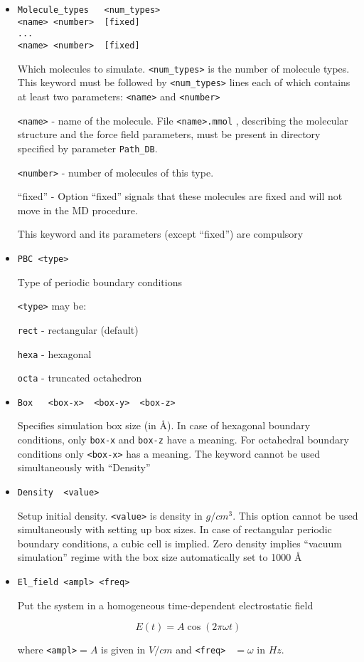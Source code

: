 \documentclass{article}
\begin{document}
\begin{itemize}

\item
\begin{verbatim}
Molecule_types   <num_types>
<name> <number>  [fixed]
...
<name> <number>  [fixed]
\end{verbatim}

Which molecules to simulate. \verb|<num_types>| is the number of molecule
types. This keyword must be followed by \verb|<num_types>| lines each of 
which contains at least two parameters: \verb|<name>| and \verb|<number>|

\verb|<name>| - name of the molecule. File \verb|<name>.mmol| , describing
the molecular structure and the force field parameters, must be 
present in directory specified by parameter \verb|Path_DB|.

\verb|<number>| - number of molecules of this type.

``fixed'' - Option ``fixed''  signals that 
these molecules are fixed and will not move in the MD procedure.

This keyword and its parameters (except ``fixed'') are compulsory

\item
\verb|PBC <type>|

Type of periodic boundary conditions

\verb|<type>| may be:

\verb|rect|   - rectangular (default)

\verb|hexa|   - hexagonal

\verb|octa|   - truncated octahedron

\item
\verb|Box   <box-x>  <box-y>  <box-z>|

Specifies simulation box size (in \AA). In case of hexagonal boundary 
conditions, only \verb|box-x| and \verb|box-z| have a meaning. 
For octahedral boundary conditions only \verb|<box-x>| has a meaning. 
The keyword cannot be used simultaneously with ``Density''

\item
\verb|Density  <value>|

Setup initial density. \verb|<value>| is density in $g/cm^3$. This option 
cannot be used simultaneously with setting up box sizes. In case of 
rectangular periodic boundary conditions, a cubic cell is implied. Zero 
density implies ``vacuum simulation'' regime with the box size automatically 
set to 1000 \AA 

\item
\verb|El_field <ampl> <freq>|

Put the system in a homogeneous time-dependent electrostatic field 

\begin{equation}
E(t) = A\cos(2\pi\omega t)
\end{equation}

where \verb|<ampl>|$=A$ is given in $V/cm$ and \verb|<freq> | $ = \omega$ 
in $Hz$.

\end{itemize}
\end{document}
